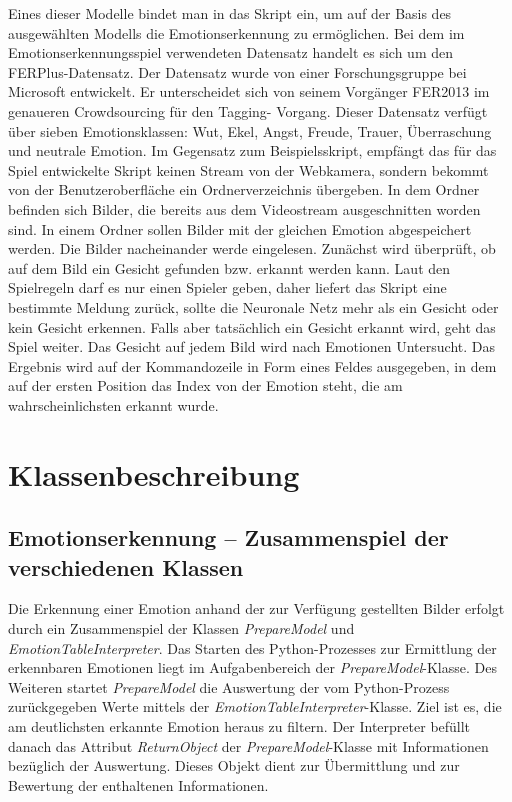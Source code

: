 \documentclass[10pt,a4paper]{report}
\begin{document}
Eines dieser Modelle  bindet man in das Skript ein, um auf der Basis des ausgewählten Modells die Emotionserkennung zu ermöglichen. Bei dem im Emotionserkennungsspiel verwendeten Datensatz 
handelt es sich um den FERPlus-Datensatz. 
 \cite{LeweOhlsen} Der Datensatz wurde
von einer Forschungsgruppe bei Microsoft entwickelt. Er unterscheidet sich
von seinem Vorgänger FER2013 im genaueren Crowdsourcing für den Tagging-
Vorgang.
 \cite{RamakrishnanPandeyKarmakarSaha} 
Dieser Datensatz verfügt über sieben Emotionsklassen: Wut, Ekel,
Angst, Freude, Trauer, Überraschung und neutrale Emotion.\newline
Im Gegensatz zum Beispielsskript, empfängt das für das Spiel entwickelte Skript 
keinen Stream von der Webkamera, sondern bekommt von der Benutzeroberfläche
ein Ordnerverzeichnis übergeben. In dem Ordner befinden sich Bilder, die bereits
aus dem Videostream ausgeschnitten worden sind. 
In einem Ordner sollen Bilder mit der gleichen Emotion abgespeichert werden. Die Bilder nacheinander werde
eingelesen.
 \newpage 
Zunächst wird überprüft, ob auf dem Bild ein Gesicht gefunden bzw.
erkannt werden kann. Laut den Spielregeln darf es nur einen Spieler geben,
daher liefert das Skript eine bestimmte Meldung zurück, sollte die Neuronale Netz mehr als ein Gesicht oder kein
Gesicht erkennen. Falls aber
tatsächlich ein Gesicht erkannt wird, geht das Spiel weiter. Das Gesicht auf
jedem Bild wird nach Emotionen Untersucht. Das Ergebnis wird auf der Kommandozeile
in Form eines Feldes ausgegeben, in dem auf der ersten Position das
Index von der Emotion steht, die am wahrscheinlichsten erkannt wurde.
\chapter{Klassenbeschreibung}
\section{Emotionserkennung – Zusammenspiel der verschiedenen Klassen}
Die Erkennung einer Emotion anhand der zur Verfügung gestellten Bilder erfolgt durch ein Zusammenspiel der Klassen \textit{PrepareModel} und \textit{EmotionTableInterpreter}. Das Starten des Python-Prozesses zur Ermittlung der erkennbaren Emotionen liegt im Aufgabenbereich der \textit{PrepareModel}-Klasse. Des Weiteren startet \textit{PrepareModel} die Auswertung der vom Python-Prozess zurückgegeben Werte mittels der \textit{EmotionTableInterpreter}-Klasse. Ziel ist es, die am deutlichsten erkannte Emotion heraus zu filtern. Der Interpreter befüllt danach das Attribut \textit{ReturnObject} der \textit{PrepareModel}-Klasse mit Informationen bezüglich der Auswertung. Dieses Objekt dient zur Übermittlung und zur Bewertung der enthaltenen Informationen.
\end{document}
